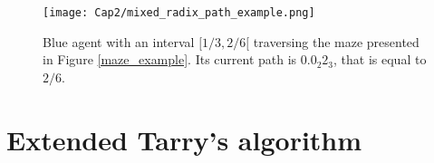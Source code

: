 \begin{figure}[ht!]
\centering
\texttt{[image: Cap2/mixed\_radix\_path\_example.png]}
\caption{Blue agent with an interval $[1/3,2/6[$ traversing the maze presented in Figure \ref{maze_example}. Its current path is $0.0_{2}2_{3}$, that is equal to $2/6$.}
\label{mixed_radix_path_example}
\end{figure}

\section{Extended Tarry's algorithm}
\label{section_models_tarry_algorithm}
